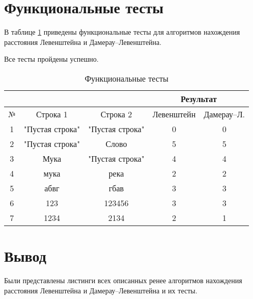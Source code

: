 \section{Функциональные тесты}
В таблице \ref{tbl:functional_test} приведены функциональные тесты для алгоритмов нахождения расстояния Левенштейна и Дамерау--Левенштейна. 

Все тесты пройдены успешно.

\FloatBarrier
\begin{table}[h]
	\begin{center}
		\begin{threeparttable}
			\captionsetup{justification=raggedright,singlelinecheck=off}
			\caption{\label{tbl:functional_test} Функциональные тесты}
			\begin{tabular}{|c|c|c|c|c|}
				\hline
				& & & \multicolumn{2}{c|}{Результат} \\
				\hline
				№ & Строка 1 & Строка 2 & Левенштейн & Дамерау--Л. \\
				\hline
				1&"Пустая строка"&"Пустая строка"&0&0 \\
				\hline
				2&"Пустая строка"&Слово&5&5 \\
				\hline
				3&Мука&"Пустая строка"&4&4 \\
				\hline
				4&мука&река&2&2 \\
				\hline
				5&абвг&гбав&3&3 \\
				\hline
				6&123&123456&3&3 \\
				\hline
				7&1234&2134&2&1 \\
				\hline
			\end{tabular}
		\end{threeparttable}
	\end{center}
\end{table}
\FloatBarrier


\section*{Вывод}

Были представлены листинги всех описанных ренее алгоритмов нахождения расстояния Левенштейна и Дамерау--Левенштейна и их тесты.

\clearpage
